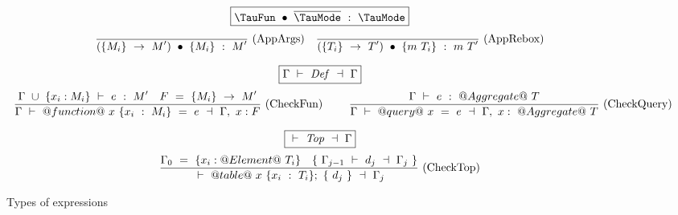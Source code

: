 \begin{figure}
$$
\boxed{\TypecheckApp{\TauFun}{\ov{\TauMode}}{\TauMode}}
$$
$$
\enskip \frac {\displaystyle 
} {\displaystyle 
  (\{M_i\}~\to~M')~\bullet~\{M_i\}~:~M'
} \  \mbox{(AppArgs)} \enskip
\enskip \frac {\displaystyle 
} {\displaystyle 
  (\{T_i\}~\to~T')~\bullet~\{m~T_i\}~:~m~T'
} \  \mbox{(AppRebox)} \enskip
$$


$$
\boxed{\TypecheckS{\Gamma}{\mi{Def}}{\Gamma}}
$$
$$
\ruleIN
{
  \Typecheck{\Gamma~\cup~\{x_i:M_i\}}{e}{M'}
  \quad
  F~=~\{M_i\}~\to~M'
}
{
  \TypecheckS{\Gamma}{@function@~x~\{x_i~:~M_i\}~=~e}{\Gamma,~x:F}
}{CheckFun}~~~~
\ruleIN
{
  \Typecheck{\Gamma}{e}{@Aggregate@~T}
}
{
  \TypecheckS{\Gamma}{@query@~x~=~e}{\Gamma,~x:~@Aggregate@~T}
}{CheckQuery}
$$


$$
\boxed{\TypecheckS{}{\mi{Top}}{\Gamma}}
$$
$$
\ruleIN
{
  \Gamma_0~=~\{x_i:@Element@~T_i\}
  \quad
  \{~\TypecheckS{\Gamma_{j-1}}{d_j}{\Gamma_j}~\}
}
{
  \TypecheckS
    {}
    {
      @table@
      ~x~\{x_i~:~T_i\};
      ~\{~d_j~\}
    }
    {\Gamma_j}
}{CheckTop}
$$


\caption{Types of expressions}
\label{icicle:fig:source:type:exp}
\end{figure}

